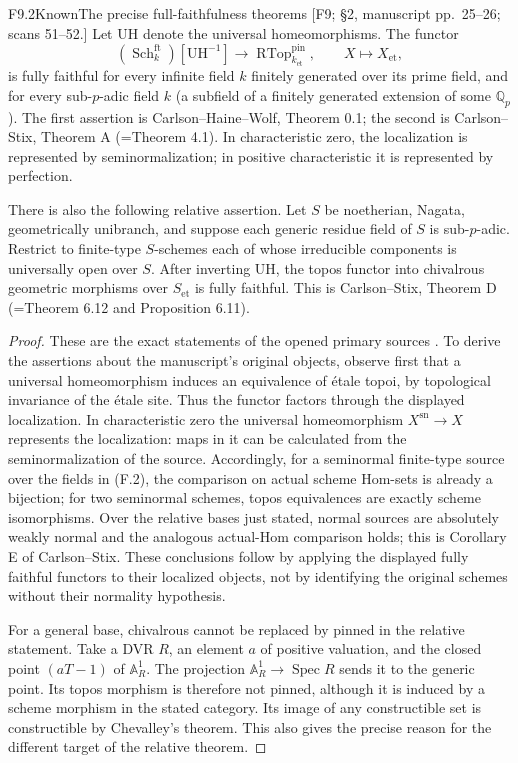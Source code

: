 \begin{result}{F9.2}{Known}{The precise full-faithfulness theorems}
\textup{[F9; \S2, manuscript pp.\ 25--26; scans 51--52.]}
Let $\mathrm{UH}$ denote the universal homeomorphisms. The functor
\[
 (\operatorname{Sch}^{\mathrm{ft}}_k)[\mathrm{UH}^{-1}]
 \longrightarrow \operatorname{RTop}^{\mathrm{pin}}_{k_{\mathrm{et}}},
 \qquad X\longmapsto X_{\mathrm{et}},                         \tag{F.2}
\]
is fully faithful for every infinite field $k$ finitely generated over
its prime field, and for every sub-$p$-adic field $k$ (a subfield of a
finitely generated extension of some $\mathbb Q_p$). The first assertion
is Carlson--Haine--Wolf, Theorem 0.1; the second is Carlson--Stix,
Theorem A (=Theorem 4.1). In characteristic zero, the localization is
represented by seminormalization; in positive characteristic it is
represented by perfection.

There is also the following relative assertion. Let $S$ be noetherian,
Nagata, geometrically unibranch, and suppose each generic residue field
of $S$ is sub-$p$-adic. Restrict to finite-type $S$-schemes each of whose
irreducible components is universally open over $S$. After inverting
$\mathrm{UH}$, the topos functor into chivalrous geometric morphisms
over $S_{\mathrm{et}}$ is fully faithful. This is Carlson--Stix,
Theorem D (=Theorem 6.12 and Proposition 6.11).
\end{result}

\begin{proof}
These are the exact statements of the opened primary sources
\cite{CF_CHW2024,CF_CarlsonStix2026}. To derive the assertions about
the manuscript's original objects, observe first that a universal
homeomorphism induces an equivalence of \'etale topoi, by topological
invariance of the \'etale site. Thus the functor factors through the
displayed localization. In characteristic zero the universal
homeomorphism $X^{\mathrm{sn}}\to X$ represents the localization:
maps in it can be calculated from the seminormalization of the source.
Accordingly, for a seminormal finite-type source over the fields in
(F.2), the comparison on actual scheme Hom-sets is already a bijection;
for two seminormal schemes, topos equivalences are exactly scheme
isomorphisms. Over the relative bases just stated, normal sources are
absolutely weakly normal and the analogous actual-Hom comparison
holds; this is Corollary E of Carlson--Stix. These conclusions follow
by applying the displayed fully faithful functors to their localized
objects, not by identifying the original schemes without their
normality hypothesis.

For a general base, chivalrous cannot be replaced by pinned in the
relative statement. Take a DVR $R$, an element $a$ of positive
valuation, and the closed point $(aT-1)$ of $\mathbb A^1_R$.
The projection $\mathbb A^1_R\to\operatorname{Spec}R$ sends it to the
generic point. Its topos morphism is therefore not pinned, although
it is induced by a scheme morphism in the stated category. Its image
of any constructible set is constructible by Chevalley's theorem.
This also gives the precise reason for the different target of the
relative theorem.
\end{proof}

